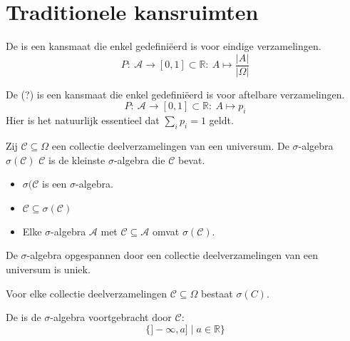 \documentclass[main.tex]{subfiles}
\begin{document}
\section{Traditionele kansruimten}
\label{sec:trad-kansr}

\begin{de}
  De  is een kansmaat die enkel gedefini\"eerd is voor eindige verzamelingen.
  \[ P:\ \mathcal{A} \rightarrow [0,1] \subset \mathbb{R}:\ A \mapsto \frac{|A|}{|\Omega|} \]
\end{de}

\begin{de}
  De  (?) is een kansmaat die enkel gedefini\"eerd is voor aftelbare verzamelingen.
  \[ P:\ \mathcal{A} \rightarrow [0,1] \subset \mathbb{R}:\ A \mapsto p_{i} \]
  Hier is het natuurlijk essentieel dat $\sum_{i}p_{i}=1$ geldt. 
\end{de}

\begin{de}
  Zij $\mathcal{C} \subseteq \Omega$ een collectie deelverzamelingen van een universum.
  De $\sigma$-algebra $\sigma(\mathcal{C})$  $\mathcal{C}$ is de kleinste $\sigma$-algebra die $\mathcal{C}$ bevat.

  \begin{itemize}
  \item $\sigma(\mathcal{C}$ is een $\sigma$-algebra.
  \item $\mathcal{C} \subseteq \sigma(\mathcal{C})$
  \item Elke $\sigma$-algebra $\mathcal{A}$ met $\mathcal{C} \subseteq \mathcal{A}$ omvat $\sigma(\mathcal{C})$.
  \end{itemize}
\end{de}

\begin{st}
  De $\sigma$-algebra opgespannen door een collectie deelverzamelingen van een universum is uniek.
\end{st}

\begin{ei}
  Voor elke collectie deelverzamelingen $\mathcal{C} \subseteq \Omega$ bestaat $\sigma(C)$.
\end{ei}

\begin{de}
  De  is de $\sigma$-algebra voortgebracht door $\mathcal{C}$:
  \[ \{ ]-\infty,a] \mid a \in \mathbb{R} \} \]  
\end{de}
\end{document}
